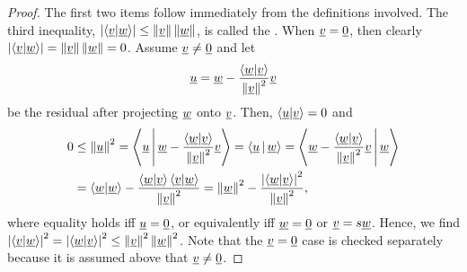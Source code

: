 \begin{proof}
The first two items follow immediately from the definitions involved.
The third inequality, $\left| \left\langle \underline{v} | \underline{w} \right\rangle \right| \leq \left\| \underline{v} \right\| \left\| \underline{w} \right\|$, is called the .
When $\underline{v} = \underline{0}$, then clearly $\left| \left\langle \underline{v} | \underline{w} \right\rangle \right| = \left\| \underline{v} \right\| \left\| \underline{w} \right\| =0$.
Assume $\underline{v} \neq \underline{0}$ and let
\begin{equation*}
\underline{u} = \underline{w} - \frac{ \left\langle \underline{w} | \underline{v} \right\rangle}{ \left\| \underline{v} \right\|^2 } \underline{v}
\end{equation*}
be the residual after projecting $\underline{w}$ onto $\underline{v}$.
Then, $\left\langle \underline{u} | \underline{v} \right\rangle = 0$ and
\begin{align*}
0 &\leq \left\| \underline{u} \right\|^2
= \left\langle \underline{u} \,\middle|\, \underline{w} - \frac{ \left\langle \underline{w} | \underline{v} \right\rangle}{ \left\| \underline{v} \right\|^2 } \underline{v} \right\rangle = \left\langle \underline{u} \,\middle|\, \underline{w} \right\rangle
= \left\langle \underline{w} - \frac{ \left\langle \underline{w} | \underline{v} \right\rangle}{ \left\| \underline{v} \right\|^2 } \underline{v} \,\middle|\, \underline{w}
 \right\rangle \\
&= \left\langle \underline{w} | \underline{w} \right\rangle
- \frac{ \left\langle \underline{w} | \underline{v} \right\rangle
\left\langle \underline{v} | \underline{w} \right\rangle}
{ \left\| \underline{v} \right\|^2 }
= \left\| \underline{w} \right\|^2
- \frac{ \left| \left\langle \underline{w} | \underline{v} \right\rangle \right|^2 }
{ \left\| \underline{v} \right\|^2 } ,
\end{align*}
where equality holds iff $\underline{u}=\underline{0}$, or equivalently iff $\underline{w}=\underline{0}$ or $\underline{v} = s \underline{w}$.
Hence, we find
$\left| \left\langle \underline{v} | \underline{w} \right\rangle \right|^2 = \left| \left\langle \underline{w} | \underline{v} \right\rangle \right|^2 \leq \left\| \underline{v} \right\|^2 \left\| \underline{w} \right\|^2$.
Note that the $\underline{v}=\underline{0}$ case is checked separately because it is assumed above that $\underline{v}\neq \underline{0}$.


\end{proof}
